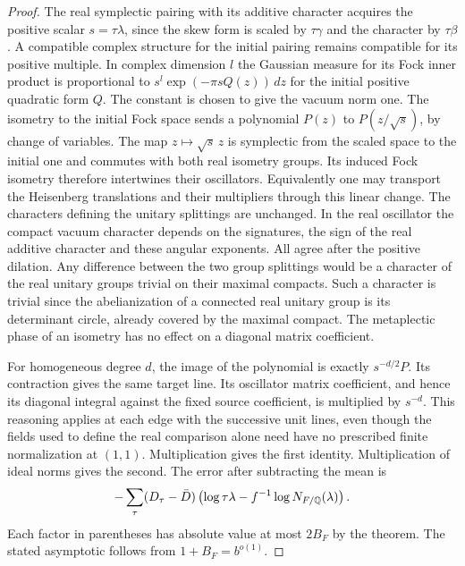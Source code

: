 \documentclass[a4paper,11pt]{article}
\theoremstyle{definition}
\theoremstyle{remark}
\numberwithin{equation}{section}
\begin{document}
\begin{proof}
The real symplectic pairing with its additive character
acquires the positive scalar \(s=\tau\lambda\), since the
skew form is scaled by \(\tau\gamma\) and the character
by \(\tau\beta\). A compatible complex structure for the
initial pairing remains compatible for its positive multiple.
In complex dimension \(l\) the Gaussian measure for its
Fock inner product is proportional to
\(s^l\exp(-\pi s Q(z))\,dz\) for the initial positive
quadratic form \(Q\). The constant is chosen to give the
vacuum norm one. The isometry to the initial Fock space
sends a polynomial \(P(z)\) to \(P(z/\sqrt s)\), by change
of variables. The map \(z\mapsto\sqrt s\,z\) is symplectic
from the scaled space to the initial one and commutes with
both real isometry groups. Its induced Fock isometry
therefore intertwines their oscillators. Equivalently
one may transport the Heisenberg translations and their
multipliers through this linear change. The characters defining the unitary splittings are unchanged.
In the real oscillator the compact vacuum character depends on
the signatures, the sign of the real additive character and
these angular exponents. All agree after the positive dilation.
Any difference between the two group splittings would be a
character of the real unitary groups trivial on their maximal
compacts. Such a character is trivial since the abelianization of
a connected real unitary group is its determinant circle,
already covered by the maximal compact.
The metaplectic phase of an isometry has no effect on a
diagonal matrix coefficient.

For homogeneous degree \(d\), the image of the polynomial
is exactly \(s^{-d/2}P\). Its contraction gives the same
target line. Its oscillator matrix coefficient, and hence
its diagonal integral against the fixed source coefficient,
is multiplied by \(s^{-d}\). This reasoning applies at
each edge with the successive unit lines, even though the
fields used to define the real comparison alone need have
no prescribed finite normalization at \((1,1)\). Multiplication
gives the first identity. Multiplication of ideal norms
gives the second. The error after subtracting the mean is
\[
 -\sum_\tau(D_\tau-\bar D)
          \left(\log\tau\lambda-f^{-1}\log N_{F/\mathbb Q}(\lambda)\right).
\]
Each factor in parentheses has absolute value at most
\(2B_F\) by the theorem. The stated asymptotic follows
from \(1+B_F=b^{o(1)}\).
\end{proof}
\end{document}
